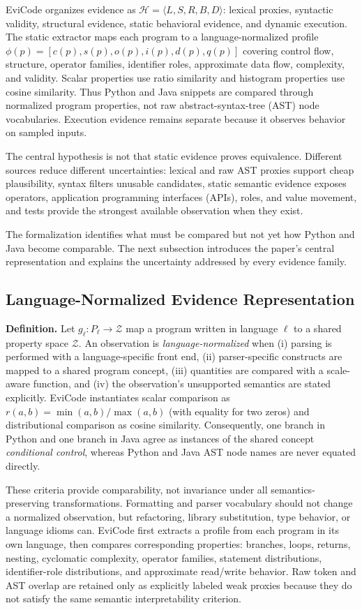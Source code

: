 ﻿\documentclass[conference]{IEEEtran}
\begin{document}
EviCode organizes evidence as $\mathcal{H}=\langle L,S,R,B,D\rangle$: lexical proxies, syntactic validity, structural evidence, static behavioral evidence, and dynamic execution. The static extractor maps each program to a language-normalized profile $\phi(p)=[c(p),s(p),o(p),i(p),d(p),q(p)]$ covering control flow, structure, operator families, identifier roles, approximate data flow, complexity, and validity. Scalar properties use ratio similarity and histogram properties use cosine similarity. Thus Python and Java snippets are compared through normalized program properties, not raw abstract-syntax-tree (AST) node vocabularies. Execution evidence remains separate because it observes behavior on sampled inputs.

The central hypothesis is not that static evidence proves equivalence. Different sources reduce different uncertainties: lexical and raw AST proxies support cheap plausibility, syntax filters unusable candidates, static semantic evidence exposes operators, application programming interfaces (APIs), roles, and value movement, and tests provide the strongest available observation when they exist.

The formalization identifies what must be compared but not yet how Python and Java become comparable. The next subsection introduces the paper's central representation and explains the uncertainty addressed by every evidence family.

\subsection{Language-Normalized Evidence Representation}
\textbf{Definition.} Let $g_\ell:P_\ell\rightarrow\mathcal{Z}$ map a program written in language $\ell$ to a shared property space $\mathcal{Z}$. An observation is \emph{language-normalized} when (i) parsing is performed with a language-specific front end, (ii) parser-specific constructs are mapped to a shared program concept, (iii) quantities are compared with a scale-aware function, and (iv) the observation's unsupported semantics are stated explicitly. EviCode instantiates scalar comparison as $r(a,b)=\min(a,b)/\max(a,b)$ (with equality for two zeros) and distributional comparison as cosine similarity. Consequently, one branch in Python and one branch in Java agree as instances of the shared concept \emph{conditional control}, whereas Python and Java AST node names are never equated directly.

These criteria provide comparability, not invariance under all semantics-preserving transformations. Formatting and parser vocabulary should not change a normalized observation, but refactoring, library substitution, type behavior, or language idioms can. EviCode first extracts a profile from each program in its own language, then compares corresponding properties: branches, loops, returns, nesting, cyclomatic complexity, operator families, statement distributions, identifier-role distributions, and approximate read/write behavior. Raw token and AST overlap are retained only as explicitly labeled weak proxies because they do not satisfy the same semantic interpretability criterion.
\end{document}
